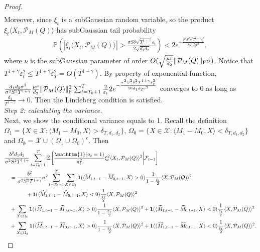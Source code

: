 \documentclass[12pt]{article}
\newcommand\fro[1]{\| #1 \|_{\rm{F}}}
\newcommand{\inp}[2]{\langle #1,#2\rangle}
\newcommand{\PP}{\mathbb{P}}
\def\EE{{\mathbb E}}
\def\PP{{\mathbb P}}
\def\indicator{\mathbf{1}}
\theoremstyle{plain}
\begin{document}
\begin{proof}
\begin{align*}
    \end{align*}
    Moreover, since $\xi_t$ is a subGaussian random variable, so the product $\xi_t\inp{X_t}{\mathcal{P}_M(Q)}$ has subGaussian tail probability
    \begin{align*}
        \PP\left(\left|\xi_t\inp{X_t}{\mathcal{P}_M(Q)}\right|> \frac{\sigma S\delta\sqrt{T^{1+\gamma}}\varepsilon_t}{2\sqrt{d_1d_2}}\right)< 2e^{-\frac{\sigma^2S^2\delta^2T^{1+\gamma}\varepsilon_t^2}{8d_1d_2\nu^2}},    
    \end{align*}
    where $\nu$ is the subGaussian parameter of order $O(\sqrt{\frac{\mu r}{d_2}}\fro{\mathcal{P}_M(Q)}\sigma)$. Notice that $T^{1+\gamma}\varepsilon_t^2\leq T^{1+\gamma}\varepsilon_T^2=O(T^{1-\gamma})$. By property of exponential function, $\frac{d_1d_2\sigma^2}{\sigma^2S^2T^{1+\gamma}} \frac{\mu r}{d_2}\fro{\mathcal{P}_M(Q)}^2\sum_{t=T_0+1}^{T} \frac{2}{\varepsilon_t}2e^{-\frac{\sigma^2S^2\delta^2T^{1+\gamma}\varepsilon_t^2}{16d_1d_2\nu^2}}$ converges to 0 as long as $\frac{d_1}{T^{1-\gamma}} \rightarrow 0$. Then the Lindeberg condition is satisfied. \\
    \emph{Step 2: calculating the variance.} \\
    Next, we show the conditional variance equals to 1. Recall the definition $\Omega_1=\{X\in \mathcal{X}: \inp{M_1-M_0}{X}> \delta_{T,d_1,d_2}\}$, $\Omega_0=\{X\in \mathcal{X}: \inp{M_1-M_0}{X}< \delta_{T,d_1,d_2}\}$ and $\Omega_{\emptyset}=\mathcal{X}\cup (\Omega_1\cup\Omega_0)^c$. Then
    \begin{align*}
        &\frac{b^2d_1d_2}{\sigma^2S^2T^{1+\gamma}}\sum_{t=T_0+1}^T \EE\left[\frac{\mathbbm{1}(a_t=1)}{\pi_t^2}\xi_t^2\inp{X_t}{\mathcal{P}_M(Q)}^2\bigg|\mathcal{F}_{t-1}\right] \\ 
        &\quad = \frac{b^2}{\sigma^2S^2T^{1+\gamma}}\sigma^2 \sum_{t=T_0+1}^{T} \sum_{X\in \Omega_1} \indicator(\inp{\widehat{M}_{1,t-1}-\widehat{M}_{0,t-1}}{X}>0)\frac{1}{1-\frac{\varepsilon_t}{2}}\inp{X}{\mathcal{P}_M(Q)}^2 \\ &\quad\quad\quad\quad +  \indicator(\inp{\widehat{M}_{1,t-1}-\widehat{M}_{0,t-1}}{X}<0)\frac{1}{\frac{\varepsilon_t}{2}}\inp{X}{\mathcal{P}_M(Q)}^2 \\ &\quad + \sum_{X\in \Omega_0} \indicator(\inp{\widehat{M}_{1,t-1}-\widehat{M}_{0,t-1}}{X}>0)\frac{1}{1-\frac{\varepsilon_t}{2}}\inp{X}{\mathcal{P}_M(Q)}^2  +  \indicator(\inp{\widehat{M}_{1,t-1}-\widehat{M}_{0,t-1}}{X}<0)\frac{1}{\frac{\varepsilon_t}{2}}\inp{X}{\mathcal{P}_M(Q)}^2 \\
        &\quad + \sum_{X\in \Omega_\emptyset} \indicator(\inp{\widehat{M}_{1,t-1}-\widehat{M}_{0,t-1}}{X}>0)\frac{1}{1-\frac{\varepsilon_t}{2}}\inp{X}{\mathcal{P}_M(Q)}^2  +  \indicator(\inp{\widehat{M}_{1,t-1}-\widehat{M}_{0,t-1}}{X}<0)\frac{1}{\frac{\varepsilon_t}{2}}\inp{X}{\mathcal{P}_M(Q)}^2.

\end{align*}
\end{proof}
\end{document}
